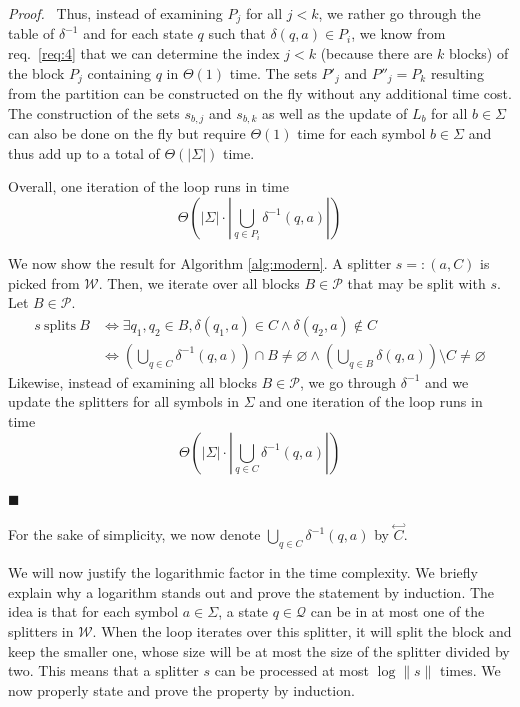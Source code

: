 \documentclass[12pt, a4 paper]{article}
\renewenvironment{proof}[1][Proof]{\begin{mdframed}[backgroundcolor=black!5, topline=false, rightline=false, bottomline=false, linecolor=black!15, linewidth=3pt]{\noindent\textit{#1.}\ }}{\noindent\par\hfill$\blacksquare$\end{mdframed}}
\theoremstyle{definition}
\begin{document}
\begin{proof}
    Thus, instead of examining $P_j$ for all $j < k$, we rather go through the table of $\delta^{-1}$ and for each state $q$ such that $\delta(q, a) \in P_i$, we know from req.\ \ref{req:4} that we can determine the index $j < k$ (because there are $k$ blocks) of the block $P_j$ containing $q$ in $\Theta(1)$ time.
    The sets $P'_j$ and $P''_j = P_k$ resulting from the partition can be constructed on the fly without any additional time cost. The construction of the sets $s_{b, j}$ and $s_{b, k}$ as well as the update of $L_b$ for all $b \in \Sigma$ can also be done on the fly but require $\Theta(1)$ time for each symbol $b \in \Sigma$ and thus add up to a total of $\Theta(\left| \Sigma \right|)$ time.

    Overall, one iteration of the loop runs in time
    $$\Theta \left( \left| \Sigma \right| \cdot \left| \bigcup_{q \in P_i} \delta^{-1}(q, a) \right| \right) $$

    \bigskip
    We now show the result for Algorithm \ref{alg:modern}. A splitter ${s =: (a, C)}$ is picked from $\mathcal{W}$.
    Then, we iterate over all blocks $B \in \mathcal{P}$ that may be split with $s$. Let $B \in \mathcal{P}$.
    \begin{align*}
        s\ \text{splits}\ B &\iff \exists q_1, q_2 \in B, \delta(q_1, a) \in C \land \delta(q_2, a) \notin C\\
        &\iff \left(\bigcup_{q \in C} \delta^{-1}(q, a)\right)\cap B \neq \varnothing \land \left(\bigcup_{q \in B}\delta(q, a)\right)\setminus C \neq \varnothing
    \end{align*}
    Likewise, instead of examining all blocks $B \in \mathcal{P}$, we go through $\delta^{-1}$ and we update the splitters for all symbols in $\Sigma$ and one iteration of the loop runs in time
    $$\Theta \left( \left| \Sigma \right| \cdot \left| \bigcup_{q \in C} \delta^{-1}(q, a) \right| \right) $$
\end{proof}

For the sake of simplicity, we now denote $\displaystyle{\bigcup_{q \in C} \delta^{-1}(q, a)}$ by $\overset{\hookleftarrow}{C}$.

We will now justify the logarithmic factor in the time complexity.
We briefly explain why a logarithm stands out and prove the statement by induction.
The idea is that for each symbol $a \in \Sigma$, a state $q \in \mathcal{Q}$ can be in at most one of the splitters in $\mathcal{W}$.
When the loop iterates over this splitter, it will split the block and keep the smaller one, whose size will be at most the size of the splitter divided by two.
This means that a splitter $s$ can be processed at most $\log \| s \|$ times.
We now properly state and prove the property by induction.
\end{document}
